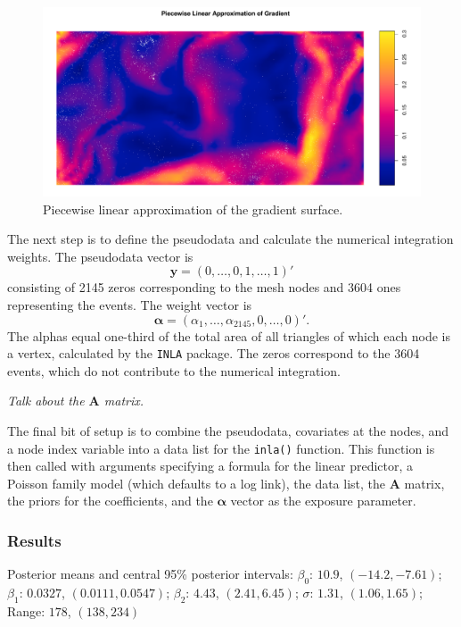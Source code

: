 \documentclass[]{interact}
\begin{document}
\begin{figure}[h]
\includegraphics[width=\textwidth]{figures/bei_grad_mesh.pdf}
\caption{Piecewise linear approximation of the gradient surface.}
\label{beigradmesh}
\end{figure}

The next step is to define the pseudodata and calculate the numerical
integration weights. The pseudodata vector is
\begin{displaymath}
\mathbf{y} = (0, \dots, 0, 1, \dots, 1)'
\end{displaymath}
consisting of 2145 zeros corresponding to the mesh nodes and 3604 ones
representing the events. The weight vector is
\begin{displaymath}
\boldsymbol{\alpha} = (\alpha_{1}, \dots, \alpha_{2145}, 0, \dots, 0)'.
\end{displaymath}
The alphas equal one-third of the total area of all triangles of which each
node is a vertex, calculated by the \texttt{INLA} package. The zeros
correspond to the 3604 events, which do not contribute to the numerical
integration.

{\it Talk about the \(\mathbf{A}\) matrix.}

The final bit of setup is to combine the pseudodata, covariates at the nodes,
and a node index variable into a data list for the \texttt{inla()} function.
This function is then called with arguments specifying a formula for the
linear predictor, a Poisson family model (which defaults to a log link), the
data list, the \(\mathbf{A}\) matrix, the priors for the coefficients, and the
\(\boldsymbol{\alpha}\) vector as the exposure parameter.


\subsubsection{Results}

Posterior means and central 95\% posterior intervals:
\(\beta_{0}\): \(10.9\), \((-14.2, -7.61)\);
\(\beta_{1}\): \(0.0327\), \((0.0111, 0.0547)\);
\(\beta_{2}\): \(4.43\), \((2.41, 6.45)\);
\(\sigma\): \(1.31\), \((1.06, 1.65)\);
Range: \(178\), \((138, 234)\)
\end{document}
